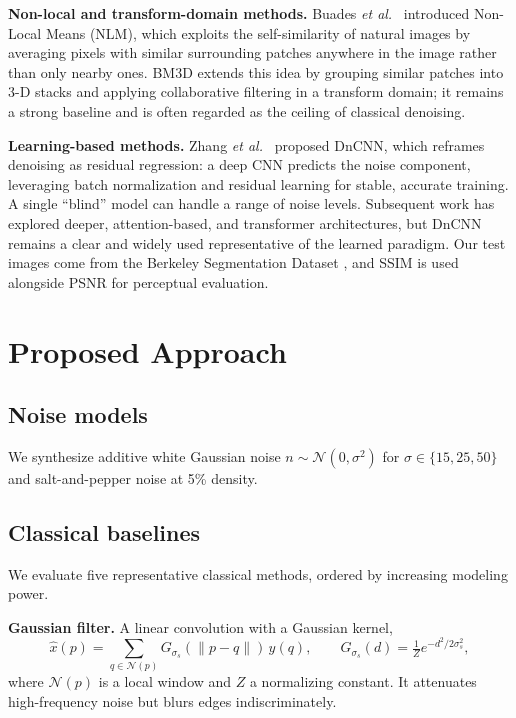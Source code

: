 \documentclass[conference]{IEEEtran}
\begin{document}
\textbf{Non-local and transform-domain methods.} Buades \emph{et al.}\
\cite{buades2005} introduced Non-Local Means (NLM), which exploits the
self-similarity of natural images by averaging pixels with similar surrounding
patches anywhere in the image rather than only nearby ones. BM3D
\cite{dabov2007} extends this idea by grouping similar patches into 3-D stacks
and applying collaborative filtering in a transform domain; it remains a strong
baseline and is often regarded as the ceiling of classical denoising.

\textbf{Learning-based methods.} Zhang \emph{et al.}\ \cite{zhang2017} proposed
DnCNN, which reframes denoising as residual regression: a deep CNN predicts the
noise component, leveraging batch normalization and residual learning for
stable, accurate training. A single ``blind'' model can handle a range of noise
levels. Subsequent work has explored deeper, attention-based, and
transformer architectures, but DnCNN remains a clear and widely used
representative of the learned paradigm. Our test images come from the Berkeley
Segmentation Dataset \cite{martin2001}, and SSIM \cite{wang2004ssim} is used
alongside PSNR for perceptual evaluation.

\section{Proposed Approach}\label{sec:method}
\subsection{Noise models}
We synthesize additive white Gaussian noise $n \sim \mathcal{N}(0,\sigma^2)$ for
$\sigma \in \{15,25,50\}$ and salt-and-pepper noise at 5\% density.

\subsection{Classical baselines}
We evaluate five representative classical methods, ordered by increasing
modeling power.

\textbf{Gaussian filter.} A linear convolution with a Gaussian kernel,
\begin{equation}
\hat{x}(p) = \sum_{q\in\mathcal{N}(p)} G_{\sigma_s}(\lVert p-q\rVert)\, y(q),
\qquad G_{\sigma_s}(d)=\tfrac{1}{Z}e^{-d^2/2\sigma_s^2},
\end{equation}
where $\mathcal{N}(p)$ is a local window and $Z$ a normalizing constant. It
attenuates high-frequency noise but blurs edges indiscriminately.
\end{document}
